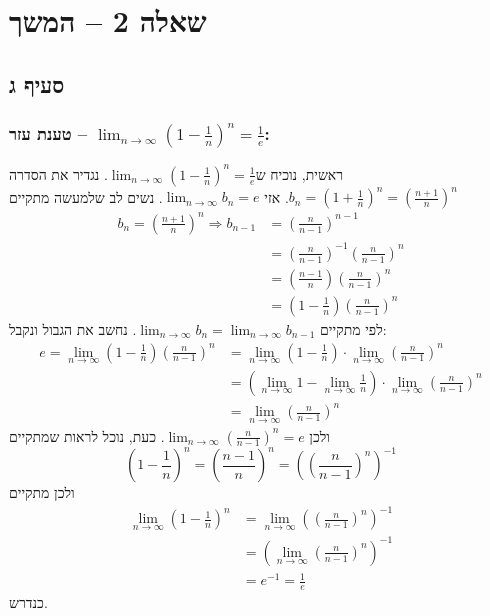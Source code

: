 \documentclass[11pt, oneside]{article}
\newcommand{\qed}{\R{$\blacksquare$}}
\newcommand{\br}{\\\\\\\\\\\\\\}
\newcommand{\logr}[1]{\underset{\text{#1}}{\Rightarrow}}
\newcommand{\m}[3]{\R{משפט #2.#1#3}}
\begin{document}
\section*{שאלה 2 -- המשך}
\subsection*{סעיף ג}
\subsubsection*{טענת עזר -- $\lim_{n \to \infty} (1 - \frac{1}{n})^{n} = \frac{1}{e}$:}
ראשית, נוכיח ש$\lim_{n \to \infty} (1 - \frac{1}{n})^{n} = \frac{1}{e}$. נגדיר את הסדרה $b_{n} = (1 + \frac{1}{n})^{n} = (\frac{n + 1}{n})^{n}$. אזי $\lim_{n \to \infty} b_{n} = e$. נשים לב שלמעשה מתקיים
\begin{align*}
b_{n} = \left(\frac{n + 1}{n}\right)^{n}
\logr{} b_{n - 1}
& = \left(\frac{n}{n - 1}\right)^{n - 1}\\
& = \left(\frac{n}{n - 1}\right)^{-1}\left(\frac{n}{n - 1}\right)^{n}\\
& = \left(\frac{n - 1}{n}\right)\left(\frac{n}{n - 1}\right)^{n}\\
& = \left(1 - \frac{1}{n}\right)\left(\frac{n}{n - 1}\right)^{n}
\end{align*}
לפי \m{2}{92}{} מתקיים $\lim_{n \to \infty} b_{n} = \lim_{n \to \infty} b_{n - 1}$. נחשב את הגבול ונקבל:
\begin{align*}
e = \lim_{n \to \infty} \left(1 - \frac{1}{n}\right)\left(\frac{n}{n - 1}\right)^{n}
& = \lim_{n \to \infty} \left(1 - \frac{1}{n}\right) \cdot \lim_{n \to \infty}\left(\frac{n}{n - 1}\right)^{n}\\
& = \left(\lim_{n \to \infty} 1 - \lim_{n \to \infty} \frac{1}{n}\right) \cdot \lim_{n \to \infty}\left(\frac{n}{n - 1}\right)^{n}\\
& = \lim_{n \to \infty} \left(\frac{n}{n - 1}\right)^{n}
\end{align*}
ולכן $\lim_{n \to \infty} \left(\frac{n}{n - 1}\right)^{n} = e$. כעת, נוכל לראות שמתקיים
\[
\left(1 - \frac{1}{n}\right)^{n}
= \left(\frac{n - 1}{n}\right)^{n}
= \left(\left(\frac{n}{n - 1}\right)^{n}\right)^{-1}
\]
ולכן מתקיים
\begin{align*}
\lim_{n \to \infty} \left(1 - \frac{1}{n}\right)^{n}
& = \lim_{n \to \infty} \left(\left(\frac{n}{n - 1}\right)^{n}\right)^{-1}\\
& = \left(\lim_{n \to \infty} \left(\frac{n}{n - 1}\right)^{n}\right)^{-1}\\
& = e^{-1} = \frac{1}{e}
\end{align*}
כנדרש.
\br\qed
\clearpage
\end{document}
